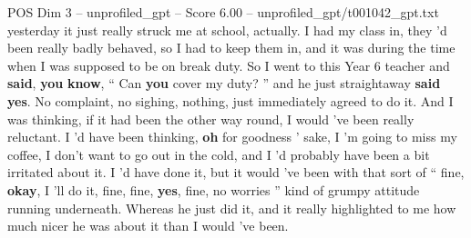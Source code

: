 \begin{textsample}{POS Dim 3 – unprofiled\_gpt – Score 6.00 – unprofiled\_gpt/t001042\_gpt.txt}  \label{ex:f3_pos_031}
yesterday it just really struck me at school, actually.
I had my class in, they ’d been really badly behaved, so I had to keep them in, and it was during the time when I was supposed to be on break duty.
So I went to this Year 6 teacher and \textbf{said}, \textbf{you} \textbf{know}, “ Can \textbf{you} cover my duty? ” and he just straightaway \textbf{said} \textbf{yes}.
No complaint, no sighing, nothing, just immediately agreed to do it.
And I was thinking, if it had been the other way round, I would ’ve been really reluctant.
I ’d have been thinking, \textbf{oh} for goodness ’ sake, I ’m going to miss my coffee, I don't want to go out in the cold, and I ’d probably have been a bit irritated about it.
I ’d have done it, but it would ’ve been with that sort of “ fine, \textbf{okay}, I ’ll do it, fine, fine, \textbf{yes}, fine, no worries ” kind of grumpy attitude running underneath.
Whereas he just did it, and it really highlighted to me how much nicer he was about it than I would ’ve been.

\end{textsample}
